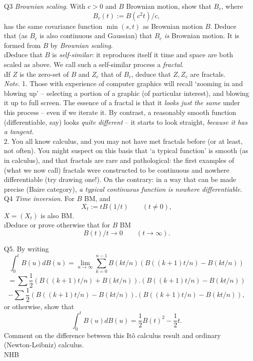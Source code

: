 \documentclass[12pt]{article}
\begin{document}
\ni Q3 {\it Brownian scaling}.  With $c > 0$ and $B$ Brownian motion, show that $B_c$, where
$$
B_c(t) := B(c^2t)/c,
$$
has the same covariance function $\min(s,t)$ as Brownian motion $B$.  Deduce that (as $B_c$ is also continuous and Gaussian) that $B_c$ {\it is} Brownian motion.  It is formed from $B$ by {\it Brownian scaling}. \\
\i Deduce that $B$ is {\it self-similar}: it reproduces itself it time and space are both scaled as above.  We call such a self-similar process a {\it fractal}. \\
\i If $Z$ is the zero-set of $B$ and $Z_c$ that of $B_c$, deduce that $Z, Z_c$ are fractals. \\
{\it Note}.  1.  Those with experience of computer graphics will recall `zooming in and blowing up' -- selecting a portion of a graphic (of particular interest), and blowing it up to full screen.  The essence of a fractal is that it {\it looks just the same} under this process -- even if we iterate it.  By contrast, a reasonably smooth function (differentiable, say) looks {\it quite different} -- it starts to look straight, {\it because it has a tangent}. \\
2.  You all know calculus, and you may not have met fractals before (or at least, not often).  You might suspect on this basis that `a typical function' is smooth (as in calculus), and that fractals are rare and pathological: the first examples of (what we now call) fractals were constructed to be continuous and nowhere differentiable (try drawing one!).  On the contrary: in a way that can be made precise (Baire category), {\it a typical continuous function is nowhere differentiable}. \\ 

\ni Q4 {\it Time inversion}.  For $B$ BM, and
$$
X_t := t B(1/t) \qquad (t \neq 0),
$$
$X = (X_t)$ is also BM. \\
\i Deduce or prove otherwise that for $B$ BM
$$
B(t)/t \to 0 \qquad (t \to \infty).
$$

\ni Q5.  By writing
$$
\int_0^t B(u) dB(u)
= \lim_{n \to \infty} \sum_{k=0}^{n-1} B(kt/n) (B((k+1)t/n)- B(kt/n))
$$
$$
=\sum \frac{1}{2}(B((k+1)t/n) + B(kt/n)).(B((k+1)t/n)- B(kt/n))
$$
$$
 - \sum \frac{1}{2}(B((k+1)t/n) - B(kt/n)).(B((k+1)t/n)- B(kt/n)),
$$
or otherwise, show that
$$
\int_0^t B(u) dB(u)
= \frac{1}{2}B(t)^2 - \frac{1}{2}t.
$$
Comment on the difference between this It\^o calculus result and ordinary (Newton-Leibniz) calculus. \\

\hfil NHB \break
\end{document}
